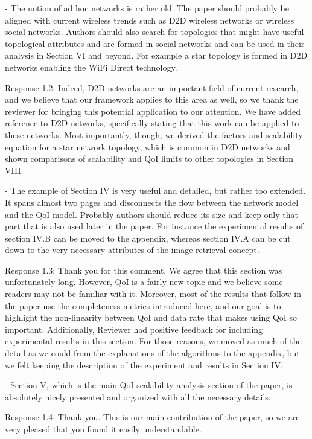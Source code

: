 \documentclass[12pt, letterpaper, onecolumn]{IEEEtran}
\begin{document}
- The notion of ad hoc networks is rather old. The paper should probably be aligned with current wireless trends such as D2D wireless networks or wireless social networks. Authors should also search for topologies that might have useful topological attributes and are formed in social networks and can be used in their analysis in Section VI and beyond. For example a star topology is formed in D2D networks enabling the WiFi Direct technology. 

{\color {blue}Response 1.2: Indeed, D2D networks are an important field of current research, and we believe that our framework applies to this area as well, so we thank the reviewer for bringing this potential application to our attention. We have added reference to D2D networks, specifically stating that this work can be applied to these networks. Most importantly, though, we derived the factors and scalability equation for a star network topology, which is common in D2D networks and shown comparisons of scalability and QoI limits to other topologies in Section VIII.}

- The example of Section IV is very useful and detailed, but rather too extended. It spans almost two pages and disconnects the flow between the network model and the QoI model. Probably authors should reduce its size and keep only that part that is also used later in the paper. For instance the experimental results of section IV.B can be moved to the appendix, whereas section IV.A can be cut down to the very necessary attributes of the image retrieval concept.

{\color {blue}
Response 1.3: Thank you for this comment. We agree that this section was unfortunately long. However, QoI is a fairly new topic and we believe some readers may not be familiar with it. Moreover, most of the results that follow in the paper use the completeness metrics introduced here, and our goal is to highlight the non-linearity between QoI and data rate that makes using QoI so important. Additionally, Reviewer had positive feedback for including experimental results in this section. For those reasons, we moved as much of the detail as we could from the explanations of the algorithms to the appendix, but we felt keeping the description of the experiment and results in Section IV. 
}

- Section V, which is the main QoI scalability analysis section of the paper, is absolutely nicely presented and organized with all the necessary details.

{\color {blue}Response 1.4: Thank you. This is our main contribution of the paper, so we are very pleased that you found it easily understandable.}
\end{document}
